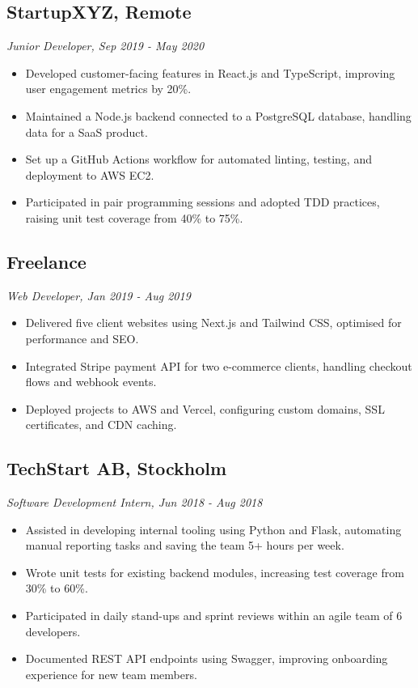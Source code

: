\documentclass[a4paper,10pt]{article}
\begin{document}
\subsection*{StartupXYZ, Remote}
\textit{Junior Developer, Sep 2019 - May 2020}
\begin{itemize}[noitemsep]
\item Developed customer-facing features in React.js and TypeScript, improving user engagement metrics by 20\%.
\item Maintained a Node.js backend connected to a PostgreSQL database, handling data for a SaaS product.
\item Set up a GitHub Actions workflow for automated linting, testing, and deployment to AWS EC2.
\item Participated in pair programming sessions and adopted TDD practices, raising unit test coverage from 40\% to 75\%.
\end{itemize}

\subsection*{Freelance}
\textit{Web Developer, Jan 2019 - Aug 2019}
\begin{itemize}[noitemsep]
\item Delivered five client websites using Next.js and Tailwind CSS, optimised for performance and SEO.
\item Integrated Stripe payment API for two e-commerce clients, handling checkout flows and webhook events.
\item Deployed projects to AWS and Vercel, configuring custom domains, SSL certificates, and CDN caching.
\end{itemize}

\subsection*{TechStart AB, Stockholm}
\textit{Software Development Intern, Jun 2018 - Aug 2018}
\begin{itemize}[noitemsep]
\item Assisted in developing internal tooling using Python and Flask, automating manual reporting tasks and saving the team 5+ hours per week.
\item Wrote unit tests for existing backend modules, increasing test coverage from 30\% to 60\%.
\item Participated in daily stand-ups and sprint reviews within an agile team of 6 developers.
\item Documented REST API endpoints using Swagger, improving onboarding experience for new team members.
\end{itemize}
\end{document}
